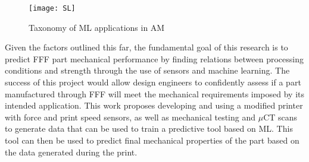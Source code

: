 \documentclass[main.tex]{subfiles}
\begin{document}
\begin{figure}[!htbp]
	\center
	\texttt{[image: SL]}
	\caption{Taxonomy of ML applications in AM \cite{Meng2020}} \label{fig:supL}
\end{figure}

Given the factors outlined this far, the fundamental goal of this research is to predict FFF part mechanical performance by finding relations between processing conditions and strength through the use of sensors and machine learning. The success of this project would allow design engineers to confidently assess if a part manufactured through FFF will meet the mechanical requirements imposed by its intended application. This work proposes developing and using a modified printer with force and print speed sensors, as well as mechanical testing and $\mu$CT scans to generate data that can be used to train a predictive tool based on ML. This tool can then be used to predict final mechanical properties of the part based on the data generated during the print. 

% 
%
%
% 
% 
% 
% 
% 
% 
% 
% 
% 
%
%
%
%
\end{document}
